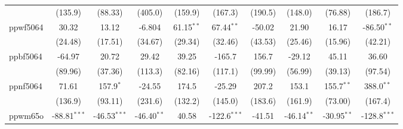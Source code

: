 \begin{table}[htbp]
\begin{tabular}{lccccccccc}
                                     & (135.9)                      & (88.33)                       & (405.0)                     & (159.9)                   & (167.3)                       & (190.5)                      & (148.0)                       & (76.88)                      & (186.7)\\   
      ppwf5064                       & 30.32                        & 13.12                         & -6.804                      & 61.15$^{**}$              & 67.44$^{**}$                  & -50.02                       & 21.90                         & 16.17                        & -86.50$^{**}$\\   
                                     & (24.48)                      & (17.51)                       & (34.67)                     & (29.34)                   & (32.46)                       & (43.53)                      & (25.46)                       & (15.96)                      & (42.21)\\   
      ppbf5064                       & -64.97                       & 20.72                         & 29.42                       & 39.25                     & -165.7                        & 156.7                        & -29.12                        & 45.11                        & 36.60\\   
                                     & (89.96)                      & (37.36)                       & (113.3)                     & (82.16)                   & (117.1)                       & (99.99)                      & (56.99)                       & (39.13)                      & (97.54)\\   
      ppnf5064                       & 71.61                        & 157.9$^{*}$                   & -24.55                      & 174.5                     & -25.29                        & 207.2                        & 153.1                         & 155.7$^{**}$                 & 388.0$^{**}$\\   
                                     & (136.9)                      & (93.11)                       & (231.6)                     & (132.2)                   & (145.0)                       & (183.6)                      & (161.9)                       & (73.00)                      & (167.4)\\   
      ppwm65o                        & -88.81$^{***}$               & -46.53$^{***}$                & -46.40$^{**}$               & 40.58                     & -122.6$^{***}$                & -41.51                       & -46.14$^{**}$                 & -30.95$^{**}$                & -128.8$^{***}$\\   

\end{tabular}
\end{table}
